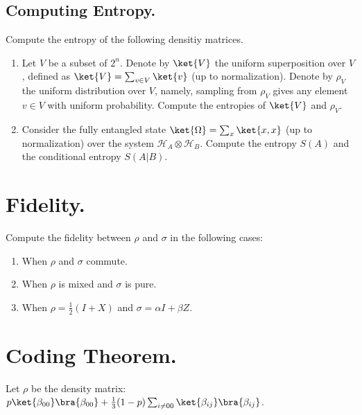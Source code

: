 \documentclass[12pt,a4paper]{article}
\begin{document}
\subsection{Computing Entropy.}
Compute the entropy of the following densitiy matrices. 
\begin{enumerate}

  \item Let $V$ be a subset of $2^{n}$. Denote by $\ket{V}$ the uniform superposition over $V$, defined as $\ket{V} = \sum_{v \in V}{\ket{v}}$ (up to normalization). Denote by $\rho_{V}$ the uniform distribution over $V$, namely, sampling from $\rho_{V}$ gives any element $v \in V$ with uniform probability. Compute the entropies of $\ket{V}$ and $\rho_{V}$.
  \item  Consider the fully entangled state $\ket{\Omega} = \sum_{x}{\ket{x,x}}$ (up to normalization) over the system $\mathcal{H}_{A} \otimes \mathcal{H}_{B}$. Compute the entropy $S(A)$ and the conditional entropy $S(A|B)$.
   
\end{enumerate}


\section{Fidelity.}
Compute the fidelity between $\rho$ and $\sigma$ in the following cases: 
\begin{enumerate}
  \item When $\rho$ and $\sigma$ commute. 
  \item When $\rho$ is mixed and $\sigma$ is pure.  
  \item When $\rho = \frac{1}{2}\left( I + X \right)$ and $\sigma = \alpha I + \beta Z$.
\end{enumerate}
\section{Coding Theorem.} 
Let $\rho$ be the density matrix: $p \ket{\beta_{00}}\bra{\beta_{00}} + \frac{1}{3}(1-p)\sum_{i \neq 00}{\ket{\beta_{ij}}\bra{\beta_{ij}}}$.

\printbibliography 
\end{document}
